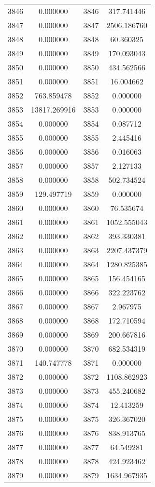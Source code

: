 \documentclass[12pt]{article}
\begin{document}
\begin{longtable}{@{}cccc@{}}
3846 & 0.000000 & 3846 & 317.741446 \\
3847 & 0.000000 & 3847 & 2506.186760 \\
3848 & 0.000000 & 3848 & 60.360325 \\
3849 & 0.000000 & 3849 & 170.093043 \\
3850 & 0.000000 & 3850 & 434.562566 \\
3851 & 0.000000 & 3851 & 16.004662 \\
3852 & 763.859478 & 3852 & 0.000000 \\
3853 & 13817.269916 & 3853 & 0.000000 \\
3854 & 0.000000 & 3854 & 0.087712 \\
3855 & 0.000000 & 3855 & 2.445416 \\
3856 & 0.000000 & 3856 & 0.016063 \\
3857 & 0.000000 & 3857 & 2.127133 \\
3858 & 0.000000 & 3858 & 502.734524 \\
3859 & 129.497719 & 3859 & 0.000000 \\
3860 & 0.000000 & 3860 & 76.535674 \\
3861 & 0.000000 & 3861 & 1052.555043 \\
3862 & 0.000000 & 3862 & 393.330381 \\
3863 & 0.000000 & 3863 & 2207.437379 \\
3864 & 0.000000 & 3864 & 1280.825385 \\
3865 & 0.000000 & 3865 & 156.454165 \\
3866 & 0.000000 & 3866 & 322.223762 \\
3867 & 0.000000 & 3867 & 2.967975 \\
3868 & 0.000000 & 3868 & 172.710594 \\
3869 & 0.000000 & 3869 & 200.667816 \\
3870 & 0.000000 & 3870 & 682.534319 \\
3871 & 140.747778 & 3871 & 0.000000 \\
3872 & 0.000000 & 3872 & 1108.862923 \\
3873 & 0.000000 & 3873 & 455.240682 \\
3874 & 0.000000 & 3874 & 12.413259 \\
3875 & 0.000000 & 3875 & 326.367020 \\
3876 & 0.000000 & 3876 & 838.913765 \\
3877 & 0.000000 & 3877 & 64.549281 \\
3878 & 0.000000 & 3878 & 424.923462 \\
3879 & 0.000000 & 3879 & 1634.967935 \\

\end{longtable}
\end{document}
